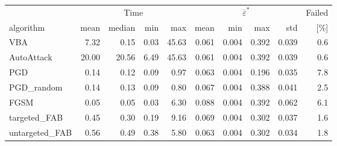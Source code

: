\small
\setlength{\tabcolsep}{3pt}
\begin{tabular}{lrrrrrrrrr}
\toprule
 & \multicolumn{4}{c}{Time} & \multicolumn{4}{c}{$\overline{\varepsilon}^*$} & Failed \\
  \cmidrule(lr){2-5}\cmidrule(lr){6-9}
algorithm & mean & median & min & max & mean & min & max & std & [\%] \\
\midrule
VBA & 7.32 & 0.15 & 0.03 & 45.63 & 0.061 & 0.004 & 0.392 & 0.039 & 0.6 \\
AutoAttack & 20.00 & 20.56 & 6.49 & 45.63 & 0.061 & 0.004 & 0.392 & 0.039 & 0.6 \\
PGD & 0.14 & 0.12 & 0.09 & 0.97 & 0.063 & 0.004 & 0.196 & 0.035 & 7.8 \\
PGD\_random & 0.14 & 0.13 & 0.09 & 0.80 & 0.067 & 0.004 & 0.388 & 0.041 & 2.5 \\
FGSM & 0.05 & 0.05 & 0.03 & 6.30 & 0.088 & 0.004 & 0.392 & 0.062 & 6.1 \\
targeted\_FAB & 0.45 & 0.30 & 0.19 & 9.16 & 0.069 & 0.004 & 0.302 & 0.037 & 1.6 \\
untargeted\_FAB & 0.56 & 0.49 & 0.38 & 5.80 & 0.063 & 0.004 & 0.302 & 0.034 & 1.8 \\
\bottomrule
\end{tabular}
